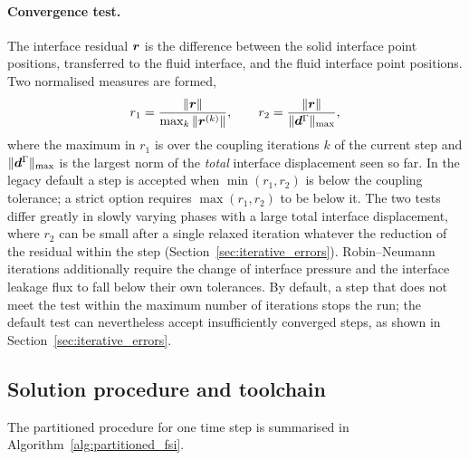 \paragraph{Convergence test.}
The interface residual $\boldsymbol{r}$ is the difference between the solid interface point positions, transferred to the fluid interface, and the fluid interface point positions.
Two normalised measures are formed,
\begin{equation}
	r_1 = \frac{\|\boldsymbol{r}\|}{\max_k \|\boldsymbol{r}^{(k)}\|},
	\qquad
	r_2 = \frac{\|\boldsymbol{r}\|}{\|\boldsymbol{d}^\Gamma\|_{\max}},
	\label{eq:coupling_residuals}
\end{equation}
where the maximum in $r_1$ is over the coupling iterations $k$ of the current step and $\|\boldsymbol{d}^\Gamma\|_{\max}$ is the largest norm of the \emph{total} interface displacement seen so far.
In the legacy default a step is accepted when $\min(r_1, r_2)$ is below the coupling tolerance; a strict option requires $\max(r_1, r_2)$ to be below it.
The two tests differ greatly in slowly varying phases with a large total interface displacement, where $r_2$ can be small after a single relaxed iteration whatever the reduction of the residual within the step (Section~\ref{sec:iterative_errors}).
Robin--Neumann iterations additionally require the change of interface pressure and the interface leakage flux to fall below their own tolerances.
By default, a step that does not meet the test within the maximum number of iterations stops the run; the default test can nevertheless accept insufficiently converged steps, as shown in Section~\ref{sec:iterative_errors}.

\subsection{Solution procedure and toolchain}\label{sec:implementation_details}

The partitioned procedure for one time step is summarised in Algorithm~\ref{alg:partitioned_fsi}.


